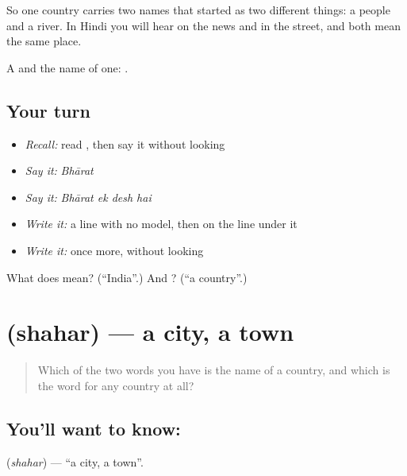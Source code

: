 So one country carries two names that started as two different things: a people and a river. In Hindi you will hear  on the news and  in the street, and both mean the same place.

\begin{grammarlens}[title={What you've built}]
A  and the name of one:    .
\end{grammarlens}

\subsection*{Your turn}
\begin{itemize}
\raggedright
  \item \emph{Recall:} read \textbf{}, then say it without looking
  \item \emph{Say it:} \emph{Bhārat}
  \item \emph{Say it:} \emph{Bhārat ek desh hai}
  \item \emph{Write it:} a  line with no model, then  on the line under it
  \item \emph{Write it:}  once more, without looking
\end{itemize}

\begin{tcolorbox}[breakable,colback=teal!4,colframe=teal!35!black,title={Before you move on}]
What does  mean? (\textquotedblleft{}India\textquotedblright{}.) And ? (\textquotedblleft{}a country\textquotedblright{}.)
\end{tcolorbox}
\section[shahar]{ (shahar) — a city, a town}

\label{lesson:HI-C68-city}



\begin{quote}
Which of the two words you have is the name of a country, and which is the word for any country at all?
\end{quote}

\subsection*{You'll want to know: }
\textbf{} (\emph{shahar}) — \textquotedblleft{}a city, a town\textquotedblright{}.


